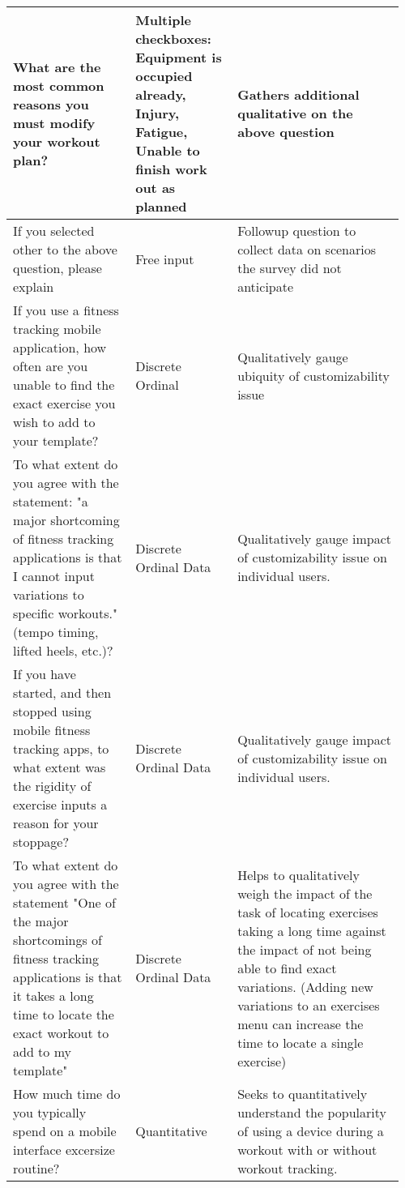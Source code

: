 \documentclass[
	letterpaper, %
]{jdf}
\begin{document}
\begin{table}[H]
\begin{tabular}{L{0.30\linewidth} L{0.25\linewidth} L{0.41\linewidth}}
            \midrule
            What are the most common reasons you must modify your workout plan? & Multiple checkboxes: Equipment is occupied already, Injury, Fatigue, Unable to finish work out as planned & Gathers additional qualitative on the above question \\
            \midrule
            If you selected other to the above question, please explain & Free input & Followup question to collect data on scenarios the survey did not anticipate  \\
            \midrule
            If you use a fitness tracking mobile application, how often are you unable to find the exact exercise you wish to add to your template? & Discrete Ordinal & Qualitatively gauge ubiquity of customizability issue \\
            \midrule
            To what extent do you agree with the statement: "a major shortcoming of fitness tracking applications is that I cannot input variations to specific workouts." (tempo timing, lifted heels, etc.)? & Discrete Ordinal Data & Qualitatively gauge impact of customizability issue on individual users. \\
            \midrule
            If you have started, and then stopped using mobile fitness tracking apps, to what extent was the rigidity of exercise inputs a reason for your stoppage? & Discrete Ordinal Data & Qualitatively gauge impact of customizability issue on individual users. \\
            \midrule
            To what extent do you agree with the statement "One of the major shortcomings of fitness tracking applications is that it takes a long time to locate the exact workout to add to my template" & Discrete Ordinal Data & Helps to qualitatively weigh the impact of the task of locating exercises taking a long time against the impact of not being able to find exact variations. (Adding new variations to an exercises menu can increase the time to locate a single exercise) \\
			\midrule
            How much time do you typically spend on a mobile interface excersize routine? & Quantitative & Seeks to quantitatively understand the popularity of using a device during a workout with or without workout tracking.\\
	\end{tabular}
\end{table}
\end{document}
